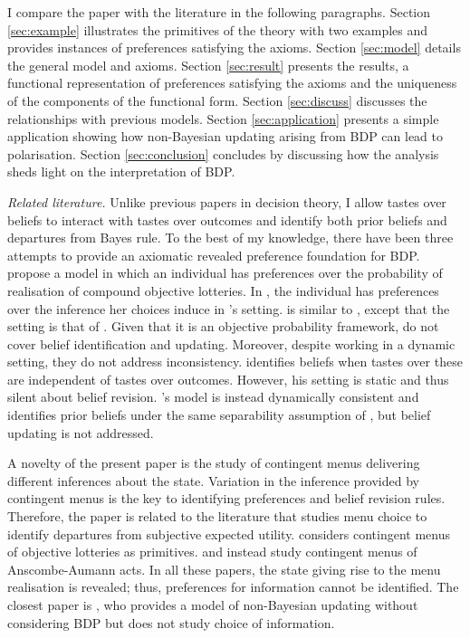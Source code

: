 I compare the paper with the literature in the following paragraphs. Section \ref{sec:example} illustrates the primitives of the theory with two examples and provides instances of preferences satisfying the axioms. Section \ref{sec:model} details the general model and axioms. Section \ref{sec:result} presents the results, a functional representation of preferences satisfying the axioms and the uniqueness of the components of the functional form. Section \ref{sec:discuss} discusses the relationships with previous models. Section \ref{sec:application} presents a simple application showing how non-Bayesian updating arising from BDP can lead to polarisation. Section \ref{sec:conclusion} concludes by discussing how the analysis sheds light on the interpretation of BDP.

\textit{Related literature.} Unlike previous papers in decision theory, I allow tastes over beliefs to interact with tastes over outcomes and identify both prior beliefs and departures from Bayes rule. To the best of my knowledge, there have been three attempts to provide an axiomatic revealed preference foundation for BDP. \cite{dillenbergerAdditivebeliefbasedPreferences2020} propose a model in which an individual has preferences over the probability of realisation of compound objective lotteries. In \cite{liangInformationdependentExpectedUtility2017}, the individual has preferences over the inference her choices induce in \cite{anscombeDefinitionSubjectiveProbability1963}'s setting. \cite{rommeswinkelPreferenceKnowledge2023} is similar to \cite{liangInformationdependentExpectedUtility2017}, except that the setting is that of \cite{savageFoundationsStatistics1972}. Given that it is an objective probability framework, \cite{dillenbergerAdditivebeliefbasedPreferences2020} do not cover belief identification and updating. Moreover, despite working in a dynamic setting, they do not address inconsistency. \cite{liangInformationdependentExpectedUtility2017} identifies beliefs when tastes over these are independent of tastes over outcomes. However, his setting is static and thus silent about belief revision. \cite{rommeswinkelPreferenceKnowledge2023}'s model is instead dynamically consistent and identifies prior beliefs under the same separability assumption of \cite{liangInformationdependentExpectedUtility2017}, but belief updating is not addressed.

A novelty of the present paper is the study of contingent menus delivering different inferences about the state. Variation in the inference provided by contingent menus is the key to identifying preferences and belief revision rules. Therefore, the paper is related to the literature that studies menu choice to identify departures from subjective expected utility. \cite{ozdenorenCompletingStateSpace2002} considers contingent menus of objective lotteries as primitives. \cite{epsteinAxiomaticModelNonBayesian2006} and \cite{epsteinColdFeet2007} instead study contingent menus of Anscombe-Aumann acts. In all these papers, the state giving rise to the menu realisation is revealed; thus, preferences for information cannot be identified. The closest paper is \cite{epsteinAxiomaticModelNonBayesian2006}, who provides a model of non-Bayesian updating without considering BDP but does not study choice of information.

